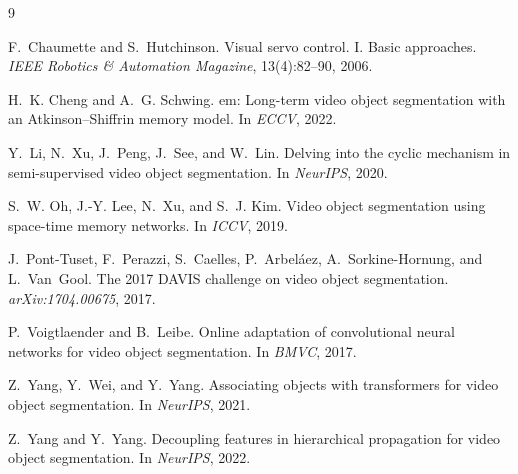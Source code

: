 \documentclass{article}
\begin{document}

{\footnotesize
\setlength{\bibsep}{0pt plus 0.2ex}
\begin{thebibliography}{9}
\providecommand{\natexlab}[1]{#1}

F.~Chaumette and S.~Hutchinson.
\newblock Visual servo control. {I}. {B}asic approaches.
\newblock \emph{IEEE Robotics \& Automation Magazine}, 13(4):82--90, 2006.

H.~K. Cheng and A.~G. Schwing.
em: Long-term video object segmentation with an {A}tkinson--{S}hiffrin memory model.
\newblock In \emph{ECCV}, 2022.

Y.~Li, N.~Xu, J.~Peng, J.~See, and W.~Lin.
\newblock Delving into the cyclic mechanism in semi-supervised video object segmentation.
\newblock In \emph{NeurIPS}, 2020.

S.~W. Oh, J.-Y. Lee, N.~Xu, and S.~J. Kim.
\newblock Video object segmentation using space-time memory networks.
\newblock In \emph{ICCV}, 2019.

J.~Pont-Tuset, F.~Perazzi, S.~Caelles, P.~Arbel\'aez, A.~Sorkine-Hornung, and L.~Van~Gool.
\newblock The 2017 {DAVIS} challenge on video object segmentation.
\newblock \emph{arXiv:1704.00675}, 2017.

P.~Voigtlaender and B.~Leibe.
\newblock Online adaptation of convolutional neural networks for video object segmentation.
\newblock In \emph{BMVC}, 2017.

Z.~Yang, Y.~Wei, and Y.~Yang.
\newblock Associating objects with transformers for video object segmentation.
\newblock In \emph{NeurIPS}, 2021.

Z.~Yang and Y.~Yang.
\newblock Decoupling features in hierarchical propagation for video object segmentation.
\newblock In \emph{NeurIPS}, 2022.

\end{thebibliography}
}
\end{document}

